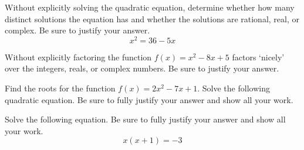 \documentclass[11pt,letterpaper]{article}
\begin{document}

 Without explicitly solving the quadratic equation, determine whether how many distinct solutions the equation has and whether the solutions are rational, real, or complex. Be sure to justify your answer.
	\[
	x^2= 36 - 5x
	\]



\newpage



 Without explicitly factoring the function $f(x)= x^2 - 8x + 5$ factors `nicely' over the integers, reals, or complex numbers. Be sure to justify your answer. 



\newpage



 Find the roots for the function $f(x)= 2x^2 - 7x + 1$. Solve the following quadratic equation. Be sure to fully justify your answer and show all your work.



\newpage



 Solve the following equation. Be sure to fully justify your answer and show all your work.
	\[
	x(x + 1)= -3
	\]
\end{document}
